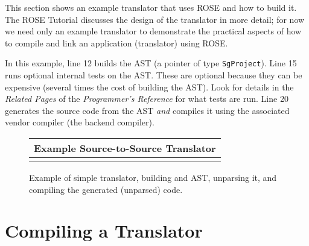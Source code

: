     This section shows an example translator that uses ROSE and how to build it.
The ROSE Tutorial discusses the design of the translator in more detail; for now we need 
only an example translator to demonstrate the practical aspects of how to compile and
link an application (translator) using ROSE.


   In this example, line 12 builds the AST
(a pointer of type {\tt SgProject}).  Line 15 runs optional internal tests on the AST.
These are optional because they can be expensive (several times the cost of building the
AST).  Look for details in the {\em Related Pages} of the {\em Programmer's Reference}
for what tests are run.  Line 20 generates the source code from the AST {\em and} compiles it
using the associated vendor compiler (the backend compiler).

{\indent
{\mySmallFontSize

\begin{latexonly}
%  
\begin{figure}[tb]
\begin{center}
\begin{tabular}{|c|} \hline
     Example Source-to-Source Translator
\\\hline\hline
   
\\\hline
\end{tabular}
\end{center}
\caption{ Example of simple translator, building and AST, unparsing it, and compiling
    the generated (unparsed) code. }
\end{figure}
\end{latexonly}

\begin{htmlonly}
   
\end{htmlonly}

\label{usingRose:simpleTranslator}

}
}



\section{Compiling a Translator}
\label{gettingStarted:compilingTranslator}



